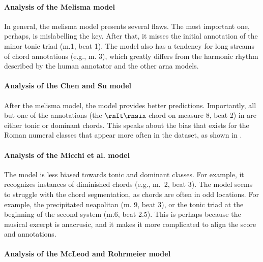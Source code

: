 \paragraph{Analysis of the Melisma model}

In general, the \gls{melisma} model presents several flaws.
The most important one, perhaps, is mislabelling the key.
After that, it misses the initial annotation of the minor
tonic triad (m.1, beat 1). The model also has a tendency for
long streams of chord annotations (e.g., m. 3), which
greatly differs from the harmonic rhythm described by the
human annotator and the other \gls{arna} models. 

\paragraph{Analysis of the Chen and Su model}

After the \gls{melisma} model, the \textcite{chen2021attend}
model provides better predictions. Importantly, all but one
of the annotations (the $\rnIt\rnsix$ chord on measure 8,
beat 2) in \textcite{chen2021attend} are either tonic or
dominant chords. This speaks about the bias that exists for
the Roman numeral classes that appear more often in the
dataset, as shown in . 

\paragraph{Analysis of the Micchi et al. model}

The \textcite{micchi2021deep} model is less biased towards
tonic and dominant classes. For example, it recognizes
instances of diminished chords (e.g., m.~2, beat 3). The
model seems to struggle with the chord segmentation, as
chords are often in odd locations. For example, the
precipitated \gls{neapolitan} (m. 9, beat 3), or the tonic
triad at the beginning of the second system (m.6, beat 2.5).
This is perhaps because the musical excerpt is anacrusic,
and it makes it more complicated to align the score and
annotations. 

\paragraph{Analysis of the McLeod and Rohrmeier model}

